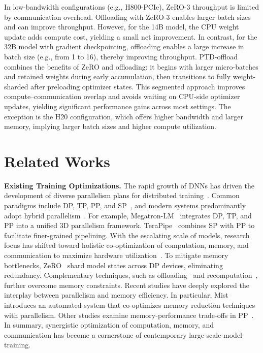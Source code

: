 \documentclass[letterpaper,twocolumn,10pt]{article}
\begin{document}
In low-bandwidth configurations (e.g., H800-PCIe), ZeRO-3 throughput is limited by communication overhead. Offloading with ZeRO-3 enables larger batch sizes and can improve throughput. However, for the 14B model, the CPU weight update adds compute cost, yielding a small net improvement. In contrast, for the 32B model with gradient checkpointing, offloading enables a large increase in batch size (e.g., from 1 to 16), thereby improving throughput. PTD-offload combines the benefits of ZeRO and offloading: it begins with larger micro-batches and retained weights during early accumulation, then transitions to fully weight-sharded after preloading optimizer states. This segmented approach improves compute–communication overlap and avoids waiting on CPU-side optimizer updates, yielding significant performance gains across most settings. The exception is the H20 configuration, which offers higher bandwidth and larger memory, implying larger batch sizes and higher compute utilization.


\section{Related Works}


\textbf{Existing Training Optimizations.} The rapid growth of DNNs has driven the development of diverse parallelism plans for distributed training~\cite{duan2024efficient, verbraeken2020survey}. Common paradigms include DP, TP, PP, and SP~\cite{jacobs2023deepspeed}, and modern systems predominantly adopt hybrid parallelism~\cite{jain2020gems, park2020hetpipe}. For example, Megatron-LM~\cite{narayanan2021efficient} integrates DP, TP, and PP into a unified 3D parallelism framework. TeraPipe~\cite{li2021terapipe} combines SP with PP to facilitate finer-grained pipelining. With the escalating scale of models, research focus has shifted toward holistic co-optimization of computation, memory, and communication to maximize hardware utilization~\cite{zhu2025mist, zhuang2023optimizing}. To mitigate memory bottlenecks, ZeRO~\cite{rajbhandari2020zero} shard model states across DP devices, eliminating redundancy. Complementary techniques, such as offloading~\cite{ren2021zero} and recomputation~\cite{chen2016training}, further overcome memory constraints. Recent studies have deeply explored the interplay between parallelism and memory efficiency. In particular, Mist~\cite{zhu2025mist} introduces an automated system that co-optimizes memory reduction techniques with parallelism. Other studies examine memory-performance trade-offs in PP~\cite{kim2023bpipe, wan2025pipeoffload, qi2024pipeline}. In summary, synergistic optimization of computation, memory, and communication has become a cornerstone of contemporary large-scale model training.
\end{document}

